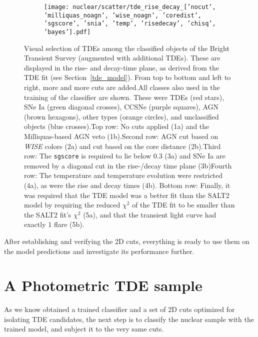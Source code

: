 \begin{figure}[htbp]
\begin{subfigure}[b]{0.49\textwidth}
  \end{subfigure}
  \begin{subfigure}[b]{0.49\textwidth}
    \centering
    \texttt{[image: nuclear/scatter/tde\_rise\_decay\_['nocut', 'milliquas\_noagn', 'wise\_noagn', 'coredist', 'sgscore', 'snia', 'temp', 'risedecay', 'chisq', 'bayes'].pdf]}
  \end{subfigure}
  \caption[BTS selection]{Visual selection of TDEs among the classified objects of the Bright Transient Survey (augmented with additional TDEs). These are displayed in the rise- and decay-time plane, as derived from the TDE fit (see Section~\ref{tde_model}). From top to bottom and left to right, more and more cuts are added.\newline \newline All classes also used in the training of the classifier are shown. These were TDEs (red stars), SNe Ia (green diagonal crosses), CCSNe (purple squares), AGN (brown hexagons), other types (orange circles), and unclassified objects (blue crosses).\newline \newline Top row: No cuts applied (1a) and the Milliquas-based AGN veto (1b).\newline \newline Second row: AGN cut based on \textit{WISE} colors (2a) and cut based on the core distance (2b).\newline \newline Third row: The \texttt{sgscore} is required to lie below 0.3 (3a) and SNe Ia are removed by a diagonal cut in the rise-/decay time plane (3b)\newline \newline Fourth row: The temperature and temperature evolution were restricted (4a), as were the rise and decay times (4b). \newline \newline Bottom row: Finally, it was required that the TDE model was a better fit than the SALT2 model by requiring the reduced $\chi^2$ of the TDE fit to be smaller than the SALT2 fit's $\chi^2$ (5a), and that the transient light curve had exactly 1 flare (5b).}
\end{figure}

After establishing and verifying the 2D cuts, everything is ready to use them on the model predictions and investigate its performance further.

\section{A Photometric TDE sample}
As we know obtained a trained classifier and a set of 2D cuts optimized for isolating TDE candidates, the next step is to classify the nuclear sample with the trained model, and subject it to the very same cuts.

